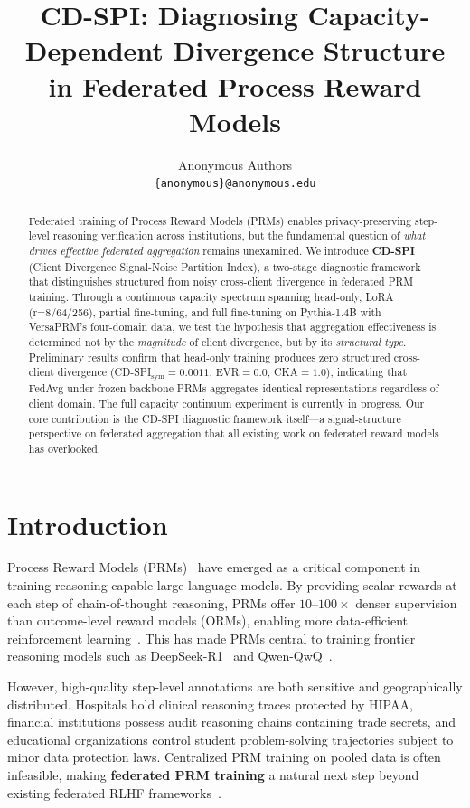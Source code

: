 \documentclass{article}
\title{\Large\textbf{CD-SPI: Diagnosing Capacity-Dependent Divergence Structure\\in Federated Process Reward Models}}
\author{%
Anonymous Authors\\
\texttt{\{anonymous\}@anonymous.edu}
}
\begin{document}
\maketitle

\begin{abstract}
Federated training of Process Reward Models (PRMs) enables privacy-preserving step-level reasoning verification across institutions, but the fundamental question of \emph{what drives effective federated aggregation} remains unexamined.
We introduce \textbf{CD-SPI} (Client Divergence Signal-Noise Partition Index), a two-stage diagnostic framework that distinguishes structured from noisy cross-client divergence in federated PRM training.
Through a continuous capacity spectrum spanning head-only, LoRA (r=8/64/256), partial fine-tuning, and full fine-tuning on Pythia-1.4B with VersaPRM's four-domain data, we test the hypothesis that aggregation effectiveness is determined not by the \emph{magnitude} of client divergence, but by its \emph{structural type}.
Preliminary results confirm that head-only training produces zero structured cross-client divergence (CD-SPI$_{\text{sym}}=0.0011$, EVR$=0.0$, CKA$=1.0$), indicating that FedAvg under frozen-backbone PRMs aggregates identical representations regardless of client domain.
The full capacity continuum experiment is currently in progress.
Our core contribution is the CD-SPI diagnostic framework itself---a signal-structure perspective on federated aggregation that all existing work on federated reward models has overlooked.
\end{abstract}

\section{Introduction}

Process Reward Models (PRMs)~\cite{lightman2023lets} have emerged as a critical component in training reasoning-capable large language models.
By providing scalar rewards at each step of chain-of-thought reasoning, PRMs offer $10$--$100\times$ denser supervision than outcome-level reward models (ORMs), enabling more data-efficient reinforcement learning~\cite{prmsurvey2025}.
This has made PRMs central to training frontier reasoning models such as DeepSeek-R1~\cite{moedeepseek2025} and Qwen-QwQ~\cite{qwenqwq2025}.

However, high-quality step-level annotations are both sensitive and geographically distributed.
Hospitals hold clinical reasoning traces protected by HIPAA, financial institutions possess audit reasoning chains containing trade secrets, and educational organizations control student problem-solving trajectories subject to minor data protection laws.
Centralized PRM training on pooled data is often infeasible, making \textbf{federated PRM training} a natural next step beyond existing federated RLHF frameworks~\cite{fedbiscuit2025,fedpdpo2026,appa2026}.
\end{document}
